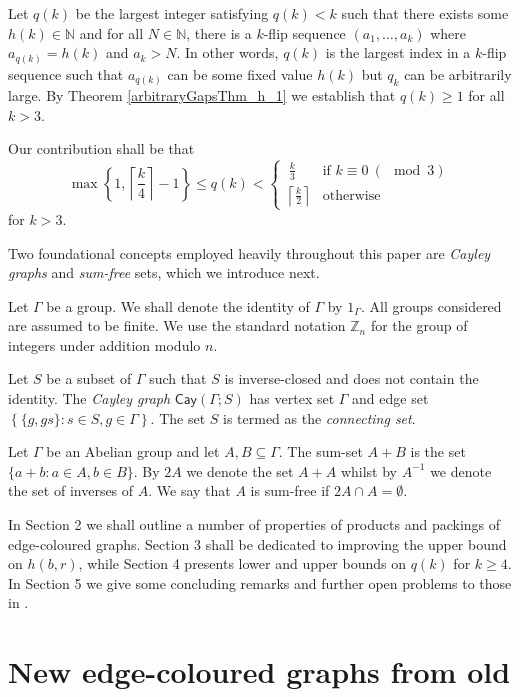 \documentclass[a4paper,12pt]{article}
\newcommand{\cay}[2]{\mathsf{Cay}\left(#1 ; #2\right)}
\begin{document}
Let $q(k)$ be the largest integer satisfying $q(k) < k$ such that there exists some $h(k) \in \mathbb{N}$ and for all $N \in \mathbb{N}$, there is a $k$-flip sequence $(a_1, \dots, a_k)$ where $a_{q(k)} = h(k)$ and $a_k > N$. In other words, $q(k)$ is the largest index in a $k$-flip sequence such that $a_{q(k)}$ can be some fixed value $h(k)$ but $q_k$ can be arbitrarily large. By Theorem \ref{arbitraryGapsThm_h_1} we establish that $q(k) \geq 1$ for all $k > 3$. 

Our contribution shall be that $$\max\left\{1, \left\lceil\frac{k}{4}\right\rceil - 1\right\} \leq q(k) < \begin{cases}
 	\ \frac{k}{3} & \mbox{if $k \equiv 0 \ (\!\!\!\!\!\!\mod 3)$} \\
 	\left\lceil \frac{k}{2}\right\rceil & \mbox{otherwise}
 \end{cases}$$ for $k > 3$.

Two foundational concepts employed heavily throughout this paper are \textit{Cayley graphs} and \textit{sum-free} sets, which we introduce next. 

Let $\Gamma$ be a group. We shall denote the identity of $\Gamma$ by $1_\Gamma$. All groups considered are assumed to be finite. We use the standard notation $\mathbb{Z}_n$ for the group of integers under addition modulo $n$.

Let $S$ be a subset of $\Gamma$ such that $S$ is inverse-closed and does not contain the identity. The \textit{Cayley graph} $\cay{\Gamma}{S}$ has vertex set $\Gamma$ and edge set $\left\{\{g, gs\}\colon s \in S, g \in \Gamma\right\}$. The set $S$ is termed as the \textit{connecting set}.
 
Let $\Gamma$ be an Abelian group and let $A, B \subseteq \Gamma$. The sum-set $A+B$ is the set $\{a+b\colon a \in A, b \in B\}$. By $2A$ we denote the set $A + A$ whilst by $A^{-1}$ we denote the set of inverses of $A$. We say that $A$ is sum-free if $2A \cap A = \emptyset$. 

In Section 2 we shall outline a number of properties of products and packings of edge-coloured graphs. Section 3 shall be dedicated to improving the upper bound on $h(b,r)$, while Section 4 presents lower and upper bounds on $q(k)$ for $k \geq 4$. In Section 5 we give some concluding remarks and further open problems to those in \cite{caro2023flip}.
\section{New edge-coloured graphs from old}
\end{document}

